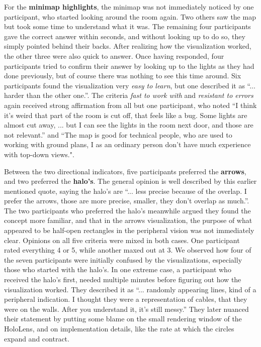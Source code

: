 For the \textbf{minimap highlights}, the minimap was not immediately noticed by one participant, who started looking around the room again. Two others saw the map but took some time to understand what it was. The remaining four participants gave the correct answer within seconds, and without looking up to do so, they simply pointed behind their backs. After realizing how the visualization worked, the other three were also quick to answer. Once having responded, four participants tried to confirm their answer by looking up to the lights as they had done previously, but of course there was nothing to see this time around. Six participants found the visualization very \textit{easy to learn}, but one described it as ``... harder than the other one.''. The criteria \textit{fast to work with} and \textit{resistant to errors} again received strong affirmation from all but one participant, who noted ``I think it's weird that part of the room is cut off, that feels like a bug. Some lights are almost cut away, ... but I can see the lights in the room next door, and those are not relevant.'' and ``The map is good for technical people, who are used to working with ground plans, I as an ordinary person don't have much experience with top-down views.".

Between the two directional indicators, five participants preferred the \textbf{arrows}, and two preferred the \textbf{halo's}. The general opinion is well described by this earlier mentioned quote, saying the halo's are ``... less precise because of the overlap. I prefer the arrows, those are more precise, smaller, they don't overlap as much.''. The two participants who preferred the halo's meanwhile argued they found the concept more familiar, and that in the arrows visualization, the purpose of what appeared to be half-open rectangles in the peripheral vision was not immediately clear. Opinions on all five criteria were mixed in both cases. One participant rated everything 4 or 5, while another maxed out at 3. We observed how four of the seven participants were initially confused by the visualizations, especially those who started with the halo's. In one extreme case, a participant who received the halo's first, needed multiple minutes before figuring out how the visualization worked. They described it as ``... randomly appearing lines, kind of a peripheral indication. I thought they were a representation of cables, that they were on the walls. After you understand it, it's still messy.'' They later nuanced their statement by putting some blame on the small rendering window of the HoloLens, and on implementation details, like the rate at which the circles expand and contract.

